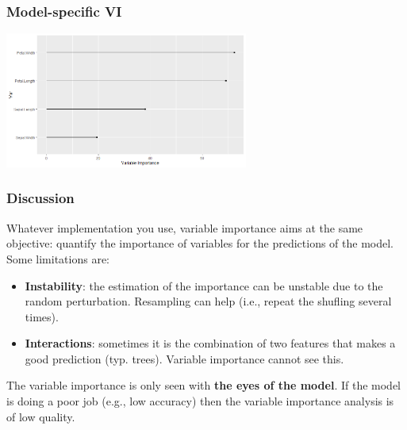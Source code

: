 \begin{frame}
\frametitle{Model-specific VI}
\begin{center}
\includegraphics[width=8cm]{../Graphs/VI_iris_rp.png}
\end{center}
\end{frame}
\begin{frame}
\frametitle{Discussion}
Whatever implementation you use, variable importance aims at the same objective: quantify the importance of variables for the predictions of the model.\\
\vspace{0.3cm}
Some limitations are:
\begin{itemize}
\item {\bf Instability}: the estimation of the importance can be unstable due to the random perturbation. Resampling can help (i.e., repeat the shufling several times). 
\item {\bf Interactions}: sometimes it is the combination of two features that makes a good prediction (typ. trees). Variable importance cannot see this. 
\end{itemize}
The variable importance is only seen with {\bf the eyes of the model}. If the model is doing a poor job (e.g., low accuracy) then the variable importance analysis is of low quality.
\end{frame}
